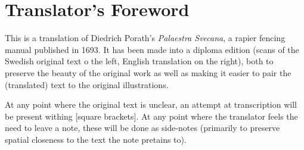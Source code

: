 \chapter{Translator's Foreword}

This is a translation of Diedrich Porath's {\it Palaestra Svecana}, a rapier fencing manual published in 1693. It has been made into a diploma edition (scans of the Swedish original text o the left, English translation on the right), both to preserve the beauty of the original work as well as making it easier to pair the (translated) text to the original illustrations.

At any point where the original text is unclear, an attempt at transcription will be present withing [square brackets]. At any point where the translator feels the need to leave a note, these will be done as side-notes (primarily to preserve spatial closeness to the text the note pretains to).